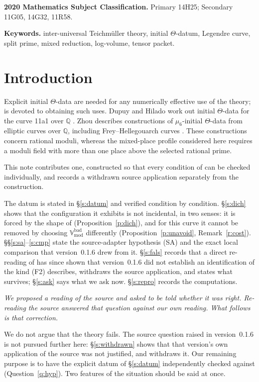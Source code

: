 \documentclass[11pt]{article}
\theoremstyle{plain}
\theoremstyle{definition}
\newcommand{\Vbad}{\mathbb{V}^{\mathrm{bad}}}
\newcommand{\SA}{\textup{(SA)}}
\begin{document}
\medskip
\noindent\textbf{2020 Mathematics Subject Classification.}
Primary 14H25; Secondary 11G05, 14G32, 11R58.

\noindent\textbf{Keywords.}
inter-universal Teichm\"uller theory, initial $\Theta$-datum, Legendre curve,
split prime, mixed reduction, log-volume, tensor packet.

\section{Introduction}\label{s:intro}

Explicit initial $\Theta$-data are needed for any numerically effective use of the
theory; \cite{MFHMP} is devoted to obtaining such uses.  Dupuy and Hilado work out initial $\Theta$-data for the curve 11a1
over $\mathbb Q$ \cite[\S2.10]{DH25}.
Zhou describes constructions of $\mu_6$-initial $\Theta$-data from
elliptic curves over $\mathbb Q$, including Frey--Hellegouarch curves
\cite[Prop.~2.5, Lemma~2.6]{Zhou}.
These constructions concern rational moduli, whereas the mixed-place
profile considered here requires a moduli field with more than one
place above the selected rational prime.

This note contributes one,
constructed so that every condition of \cite[Def.~3.1]{IUT1} can be checked
individually, and records a withdrawn source application separately from the
construction.

The datum is stated in \S\ref{s:datum} and verified condition by condition.
\S\ref{s:dich} shows that the configuration it exhibits is not incidental, in two
senses: it is forced by the shape of \cite[Def.~3.1(e)]{IUT1}
(Proposition~\ref{p:dich}), and for this curve it cannot be removed by choosing
$\Vbad_{\mathrm{mod}}$ differently (Proposition~\ref{p:unavoid},
Remark~\ref{r:cost}).  \S\S\ref{s:sa}--\ref{s:cmp} state the source-adapter hypothesis \SA{} and the
exact local comparison that version~0.1.6 drew from it.  \S\ref{s:fals} records
that a direct re-reading of \cite{IUT4} has since shown that version~0.1.6 did
not establish an identification of the kind \textup{(F2)} describes, withdraws
the source application, and states what survives;
\S\ref{s:ask} says what we ask now.
\S\ref{s:repro} records the computations.

\emph{We proposed a reading of the source and asked to be told whether it was
right.  Re-reading the source answered that question against our own reading.
What follows is that correction.}

We do not argue that the theory fails.  The source question raised in
version~0.1.6 is not pursued further here: \S\ref{s:withdrawn} shows that that
version's own application of the source was not justified, and withdraws it.  Our remaining purpose is to have the explicit datum of
\S\ref{s:datum} independently checked against \cite[Def.~3.1]{IUT1}
(Question~\ref{q:hyp}).  Two features of the situation should be said at once.
\end{document}
